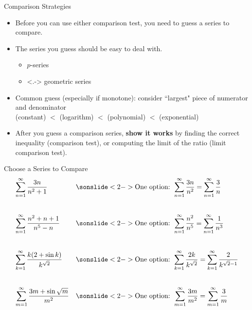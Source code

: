 \begin{frame}[t]{Comparison Strategies}
\begin{itemize}[<+->]
\item Before you can use either comparison test, you need to guess a series to compare. \vfill
\item The series you guess should be easy to deal with.\vfill
\begin{itemize}
\item $p$-series
\item<.-> geometric series
\end{itemize}\vfill
\item Common guess (especially if monotone): consider ``largest" piece of numerator and denominator\\ 
 (constant) $<$ (logarithm) $<$ (polynomial) $<$ (exponential)\vfill
\item After you guess a comparison series, \textbf{show it works} by finding the correct inequality (comparison test), or computing the limit of the ratio (limit comparison test).
\end{itemize}\vfill
\end{frame}
\begin{frame}[t]{Choose a Series to Compare}
\begin{align*}
&\sum_{n=1}^\infty \frac{3n}{n^2+1}  &&
	 \sonslide<2->{\text{One option: } \sum_{n=1}^\infty \frac{3n}{n^2}=\sum_{n=1}^\infty \frac{3}{n}}
	 \\[2em]
& \sum_{n=1}^\infty \frac{n^2+n+1}{n^5-n}  &&
	 \sonslide<2->{\text{One option: } \sum_{n=1}^\infty \frac{n^2}{n^5}= \sum_{n=1}^\infty \frac{1}{n^3}}
	 \\[2em]
&\sum_{k=1}^\infty \frac{k(2+\sin k)}{k^{\sqrt2}} &&
	 \sonslide<2->{\text{One option: } \sum_{k=1}^\infty \frac{2k}{k^{\sqrt 2}}=\sum_{k=1}^\infty \frac{2}{k^{\sqrt 2-1}}}
	 \\[2em]
&\sum_{m=1}^\infty \frac{3m+\sin\sqrt{m}}{m^2}
	&& \sonslide<2->{\text{One option: } \sum_{m=1}^\infty \frac{3m}{m^2}=\sum_{m=1}^\infty \frac{3}{m}}
\end{align*}
\end{frame}

